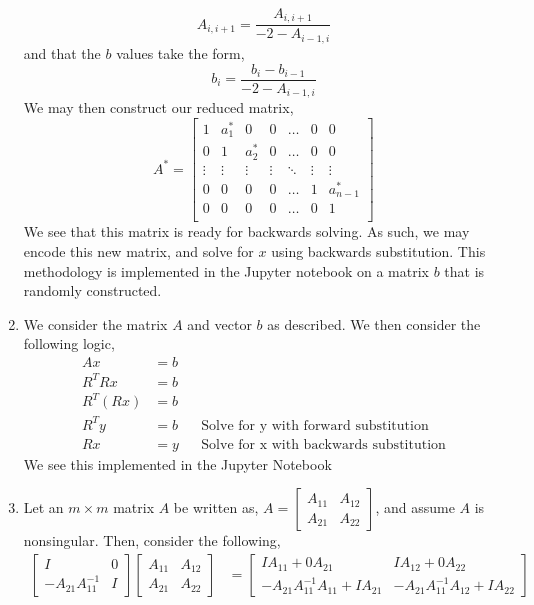 \documentclass[letterpaper,10pt]{article}
\begin{document}
\begin{enumerate}
\[A_{i,i+1}=\frac{A_{i,i+1}}{-2-A_{i-1,i}}\]
and that the $b$ values take the form,
\[b_{i}=\frac{b_{i}-b_{i-1}}{-2-A_{i-1,i}}\]
We may then construct our reduced matrix,
\[A^*=\begin{bmatrix}
1 & a_1^* & 0 & 0 & \ldots & 0 & 0\\
0 & 1 & a_2^* & 0 & \ldots & 0 & 0\\
\vdots & \vdots & \vdots & \vdots & \ddots & \vdots & \vdots\\
0 & 0 & 0 & 0 & \ldots & 1 & a_{n-1}^*\\
0 & 0 & 0 & 0 & \ldots & 0 & 1\\
\end{bmatrix} \]
We see that this matrix is ready for backwards solving. As such, we may encode this new matrix, and solve for $x$ using backwards substitution. This methodology is implemented in the Jupyter notebook on a matrix $b$ that is randomly constructed.
\item We consider the matrix $A$ and vector $b$ as described. We then consider the following logic,
\begin{align*}
Ax &= b\\
R^TRx &= b\\
R^T(Rx) &= b\\
R^Ty &= b && \text{Solve for y with forward substitution}\\
Rx &= y && \text{Solve for x with backwards substitution}
\end{align*}
We see this implemented in the Jupyter Notebook
\item Let an $m\times m$ matrix $A$ be written as, $A=\begin{bmatrix}
A_{11} & A_{12}\\ A_{21} & A_{22}
\end{bmatrix}$, and assume $A$ is nonsingular. Then, consider the following,
\begin{align*}
\begin{bmatrix}
I & 0\\-A_{21}A_{11}^{-1} & I
\end{bmatrix}\begin{bmatrix}
A_{11} & A_{12}\\ A_{21} & A_{22}
\end{bmatrix} &=\begin{bmatrix}
IA_{11}+0A_{21} & IA_{12}+0A_{22}\\ -A_{21}A_{11}^{-1}A_{11}+IA_{21} & -A_{21}A_{11}^{-1}A_{12}+IA_{22}
\end{bmatrix}\\

\end{align*}
\end{enumerate}
\end{document}
